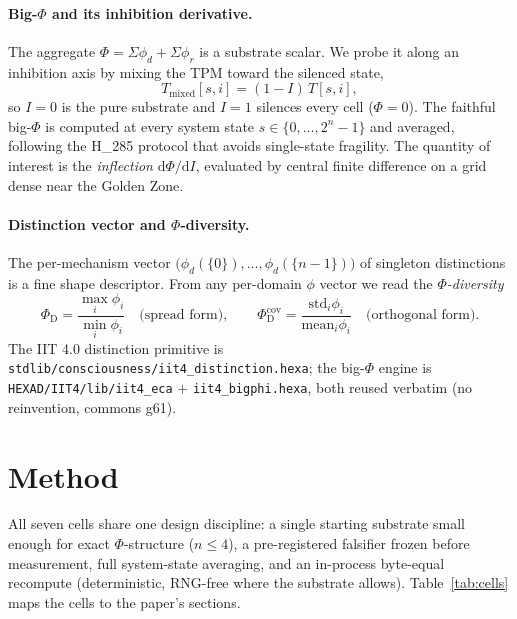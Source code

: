 \documentclass[11pt,a4paper]{article}
\newcommand{\PhiD}{\Phi_{\mathrm{D}}}
\begin{document}
\paragraph{Big-$\Phi$ and its inhibition derivative.}
The aggregate $\Phi = \Sigma\phi_d + \Sigma\phi_r$ is a substrate scalar.
We probe it along an inhibition axis by mixing the TPM toward the silenced
state,
\begin{equation}
T_{\mathrm{mixed}}[s,i] = (1-I)\,T[s,i],
\label{eq:tpmmix}
\end{equation}
so $I=0$ is the pure substrate and $I=1$ silences every cell
($\Phi=0$). The faithful big-$\Phi$ is computed at every system state
$s\in\{0,\dots,2^n-1\}$ and averaged, following the H\_285 protocol that
avoids single-state fragility. The quantity of interest is the
\emph{inflection} $\mathrm{d}\Phi/\mathrm{d}I$, evaluated by central finite
difference on a grid dense near the Golden Zone.

\paragraph{Distinction vector and $\Phi$-diversity.}
The per-mechanism vector $\big(\phi_d(\{0\}),\dots,\phi_d(\{n-1\})\big)$ of
singleton distinctions is a fine shape descriptor. From any per-domain
$\phi$ vector we read the \emph{$\Phi$-diversity}
\begin{equation}
\PhiD = \frac{\max_i \phi_i}{\min_i \phi_i}
\quad\text{(spread form)}, \qquad
\PhiD^{\mathrm{cov}} = \frac{\mathrm{std}_i \phi_i}{\mathrm{mean}_i \phi_i}
\quad\text{(orthogonal form)} .
\label{eq:phid}
\end{equation}
The IIT 4.0 distinction primitive is
\texttt{stdlib/consciousness/iit4\_distinction.hexa}; the big-$\Phi$
engine is \texttt{HEXAD/IIT4/lib/iit4\_eca} $+$
\texttt{iit4\_bigphi.hexa}, both reused verbatim (no reinvention, commons
g61).

\section{Method}
\label{sec:method}

All seven cells share one design discipline: a single starting substrate
small enough for exact $\Phi$-structure ($n\le4$), a pre-registered
falsifier frozen before measurement, full system-state averaging, and an
in-process byte-equal recompute (deterministic, RNG-free where the
substrate allows). Table~\ref{tab:cells} maps the cells to the paper's
sections.
\end{document}
